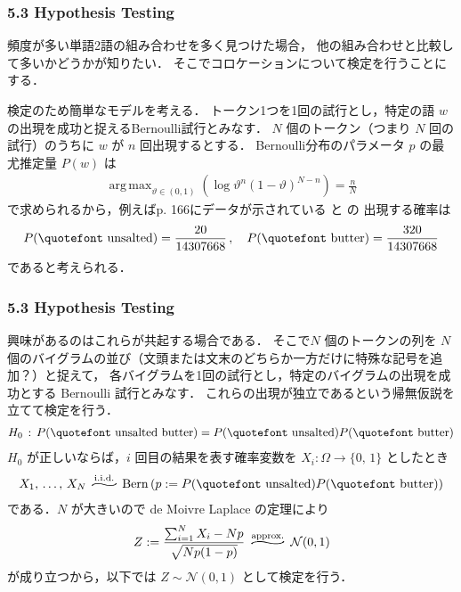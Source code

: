 \documentclass[10pt,leqno]{beamer}
\DeclareMathOperator*{\argmax}{arg\,max}
\newcommand{\uprightquote}[1]{\normalfont{\quotefont #1}}
\begin{document}
\begin{frame}
    \frametitle{5.3 Hypothesis Testing}
    頻度が多い単語2語の組み合わせを多く見つけた場合，
    他の組み合わせと比較して多いかどうかが知りたい．
    そこでコロケーションについて検定を行うことにする．

    \bigskip

    検定のため簡単なモデルを考える．
    トークン1つを1回の試行とし，特定の語 $w$ の出現を成功と捉えるBernoulli試行とみなす．
    $N$ 個のトークン（つまり $N$ 回の試行）のうちに $w$ が $n$ 回出現するとする．
    Bernoulli分布のパラメータ $p$ の最尤推定量 $P(w)$ は
    \begin{align*}
            \argmax_{\vartheta \in (0,1)}\left(\log \vartheta^n(1 - \vartheta)^{N - n}\right) = \frac{n}{N}
    \end{align*}
    で求められるから，例えばp. 166にデータが示されている \uprightquote{unsalted} と \uprightquote{butter} の
    出現する確率は
    \begin{align*}
        P(\text{\uprightquote{unsalted}}) = \frac{20}{14307668}\,, \quad P(\text{\uprightquote{butter}}) = \frac{320}{14307668}
    \end{align*}
    であると考えられる．

\end{frame}

\begin{frame}
    \frametitle{5.3 Hypothesis Testing}
    興味があるのはこれらが共起する場合である．
    そこで$N$ 個のトークンの列を $N$ 個のバイグラムの並び（文頭または文末のどちらか一方だけに特殊な記号を追加？）と捉えて，
    各バイグラムを1回の試行とし，特定のバイグラムの出現を成功とする Bernoulli 試行とみなす．
    これらの出現が独立であるという帰無仮説を立てて検定を行う．
    \begin{align*}
        H_0 \,:\, P(\text{\uprightquote{unsalted butter}}) = P(\text{\uprightquote{unsalted}}) P(\text{\uprightquote{butter}})
    \end{align*}
    $H_0$ が正しいならば，$i$ 回目の結果を表す確率変数を $X_i:\varOmega \to \{0,\,1\}$ としたとき
    \begin{align*}
        X_1,\,\ldots,\,X_N \stackrel{\mathrm{i.i.d.}}{\mbox{\scalebox{3}[1]{$\sim$}}}
        \mathrm{Bern}\left(p := P(\text{\uprightquote{unsalted}}) P(\text{\uprightquote{butter}})\right)
    \end{align*}
    である．$N$ が大きいので de Moivre Laplace の定理により
    \begin{align*}
        Z := \frac{\sum_{i = 1}^N X_i - Np}{\sqrt{Np(1-p)}}
        \stackrel{\mathrm{approx.}}{\mbox{\scalebox{4}[1]{$\sim$}}} \mathcal{N}(0,1)
    \end{align*}
    が成り立つから，以下では $Z \sim \mathcal{N}(0,1)$ として検定を行う．
\end{frame}
\end{document}
